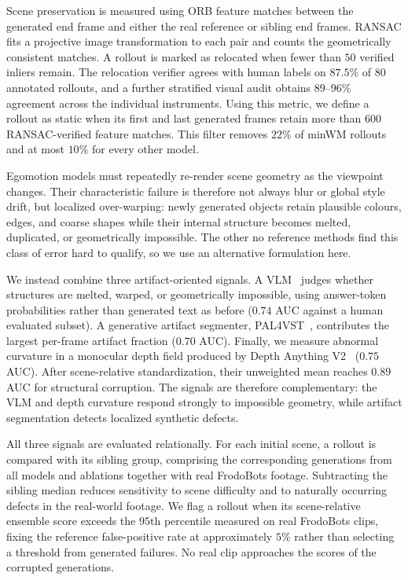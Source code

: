 \documentclass[letterpaper]{article} %
\begin{document}
Scene preservation is measured using ORB feature matches between the
generated end frame and either the real reference or sibling end frames.
RANSAC fits a projective image transformation to each pair and counts the
geometrically consistent matches. A rollout is marked as
relocated when fewer than $50$ verified inliers remain. The relocation
verifier agrees with human labels on $87.5\%$ of $80$ annotated rollouts,
and a further stratified visual audit obtains $89$--$96\%$ agreement across
the individual instruments. Using this metric, we define a rollout as static when its first and last generated frames retain more than $600$ RANSAC-verified feature matches. This filter removes $22\%$ of minWM
rollouts and at most $10\%$ for every other model.

Egomotion models must repeatedly re-render scene geometry as the viewpoint
changes. Their characteristic failure is therefore not always blur or global style drift, but localized over-warping: newly generated objects retain plausible colours, edges, and coarse shapes while their internal structure becomes melted, duplicated, or geometrically impossible. The other no reference methods find this class of error hard to qualify, so we use an alternative formulation here.

We instead combine three artifact-oriented signals. A
VLM~\cite{QWEN} judges whether structures are melted, warped, or
geometrically impossible, using answer-token probabilities rather than
generated text as before ($0.74$ AUC against a human evaluated subset). A generative artifact segmenter, PAL4VST~\cite{pal}, contributes the largest per-frame artifact fraction ($0.70$ AUC). Finally, we measure abnormal curvature in a monocular depth field produced by Depth Anything V2~\cite{depthanything} ($0.75$ AUC). After scene-relative standardization, their unweighted mean reaches $0.89$
AUC for structural corruption. The signals are therefore complementary: the VLM
and depth curvature respond strongly to impossible geometry, while artifact
segmentation detects localized synthetic defects.

All three signals are evaluated relationally. For each initial scene, a
rollout is compared with its sibling group, comprising the corresponding
generations from all models and ablations together with real FrodoBots
footage. Subtracting the sibling median reduces sensitivity to scene
difficulty and to naturally occurring defects in the real-world footage. We
flag a rollout when its scene-relative ensemble score exceeds the
$95$th percentile measured on real FrodoBots clips, fixing the reference
false-positive rate at approximately $5\%$ rather than selecting a threshold
from generated failures. No real clip approaches the scores of the
corrupted generations.
\end{document}
